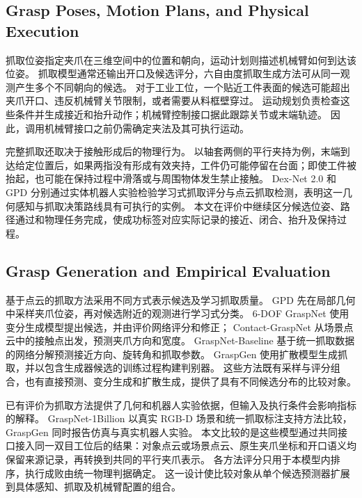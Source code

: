 \documentclass[UTF8,fontset=fandol,a4paper,11pt]{ctexart}
\newcommand{\qyb}[1]{#1}
\begin{document}
\subsection{\qyb{Grasp Poses, Motion Plans, and Physical Execution}}

抓取位姿指定夹爪在三维空间中的位置和朝向，运动计划则描述机械臂如何到达该位姿。
抓取模型通常还输出开口及候选评分，六自由度抓取生成方法可从同一观测产生多个不同朝向的候选\cite{mousavian2019,sundermeyer2021}。
对于工业工位，一个贴近工件表面的候选可能超出夹爪开口、违反机械臂关节限制，或者需要从料框壁穿过。
运动规划负责检查这些条件并生成接近和抬升动作；机械臂控制接口据此跟踪关节或末端轨迹。
因此，调用机械臂接口之前仍需确定夹法及其可执行运动。

完整抓取还取决于接触形成后的物理行为。
以轴套两侧的平行夹持为例，末端到达给定位置后，如果两指没有形成有效夹持，工件仍可能停留在台面；即使工件被抬起，也可能在保持过程中滑落或与周围物体发生禁止接触。
Dex-Net 2.0 和 GPD 分别通过实体机器人实验检验学习式抓取评分与点云抓取检测\cite{mahler2017dexnet,tenpas2017}，表明这一几何感知与抓取决策路线具有可执行的实例。
本文在评价中继续区分候选位姿、路径通过和物理任务完成，使成功标签对应实际记录的接近、闭合、抬升及保持过程。

\subsection{\qyb{Grasp Generation and Empirical Evaluation}}

基于点云的抓取方法采用不同方式表示候选及学习抓取质量。
GPD 先在局部几何中采样夹爪位姿，再对候选附近的观测进行学习式分类\cite{tenpas2017}。
6-DOF GraspNet 使用变分生成模型提出候选，并由评价网络评分和修正\cite{mousavian2019}；
Contact-GraspNet 从场景点云中的接触点出发，预测夹爪方向和宽度\cite{sundermeyer2021}。
GraspNet-Baseline 基于统一抓取数据的网络分解预测接近方向、旋转角和抓取参数\cite{fang2020}。
GraspGen 使用扩散模型生成抓取，并以包含生成器候选的训练过程构建判别器\cite{murali2026}。
这些方法既有采样与评分组合，也有直接预测、变分生成和扩散生成，提供了具有不同候选分布的比较对象。

已有评价为抓取方法提供了几何和机器人实验依据，但输入及执行条件会影响指标的解释。
GraspNet-1Billion 以真实 RGB-D 场景和统一抓取标注支持方法比较\cite{fang2020}，GraspGen 同时报告仿真与真实机器人实验\cite{murali2026}。
本文比较的是这些模型通过共同接口接入同一双目工位后的结果：对象点云或场景点云、原生夹爪坐标和开口语义均保留来源记录，再转换到共同的平行夹爪表示。
各方法评分只用于本模型内排序，执行成败由统一物理判据确定。
这一设计使比较对象从单个候选预测器扩展到具体感知、抓取及机械臂配置的组合。
\end{document}
